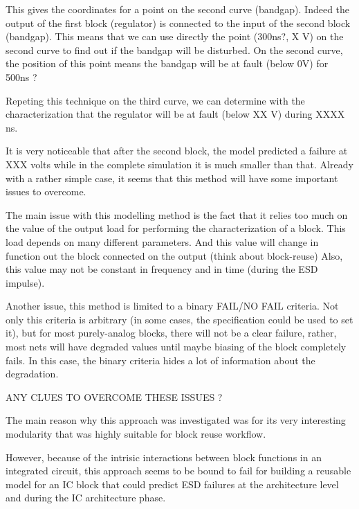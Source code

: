 This gives the coordinates for a point on the second curve (bandgap).
Indeed the output of the first block (regulator) is connected to the input of the second block (bandgap).
This means that we can use directly the point (300ns?, X V) on the second curve to find out if the bandgap will be disturbed.
On the second curve, the position of this point means the bandgap will be at fault (below 0V) for 500ns ?

Repeting this technique on the third curve, we can determine with the characterization that the regulator will be at
fault (below XX V) during XXXX ns.

It is very noticeable that after the second block, the model predicted a failure at
XXX volts while in the complete simulation it is much smaller than that.
Already with a rather simple case, it seems that this method will have some important issues to overcome.

The main issue with this modelling method is the fact that it relies too much
on the value of the output load for performing the characterization of a block.
This load depends on many different parameters.
And this value will change in function out the block connected on the output (think about block-reuse)
Also, this value may not be constant in frequency and in time (during the ESD impulse).

Another issue, this method is limited to a binary FAIL/NO FAIL criteria.
Not only this criteria is arbitrary (in some cases, the specification could be used to set it), but
for most purely-analog blocks, there will not be a clear failure, rather, most
nets will have degraded values until maybe biasing of the block completely fails.
In this case, the binary criteria hides a lot of information about the degradation.

ANY CLUES TO OVERCOME THESE ISSUES ?

The main reason why this approach was investigated was for its very interesting modularity
that was highly suitable for block reuse workflow.

However, because of the intrisic interactions between block functions in an integrated circuit,
this approach seems to be bound to fail for building a reusable model for an IC block that could predict
ESD failures at the architecture level and during the IC architecture phase.
